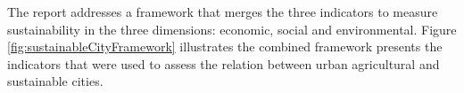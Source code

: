 The report addresses a framework that merges the three indicators to measure sustainability in the three dimensions: economic, social and environmental. Figure \ref{fig:sustainableCityFramework} illustrates the combined framework presents the indicators that were used to assess the relation between urban agricultural and sustainable cities.


